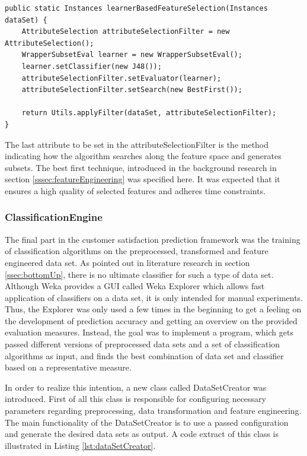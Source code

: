 \begin{lstlisting}[caption={Learner-based feature selection}, label={lst:wrapperBasedFs}]
public static Instances learnerBasedFeatureSelection(Instances dataSet) {
	AttributeSelection attributeSelectionFilter = new AttributeSelection();
	WrapperSubsetEval learner = new WrapperSubsetEval();
	learner.setClassifier(new J48());
	attributeSelectionFilter.setEvaluator(learner);
	attributeSelectionFilter.setSearch(new BestFirst());
	
	return Utils.applyFilter(dataSet, attributeSelectionFilter);
}
\end{lstlisting}

The last attribute to be set in the attributeSelectionFilter is the method indicating how the algorithm searches along the feature space and generates subsets. The best first technique, introduced in the background research in section \ref{sssec:featureEngineering} was specified here. It was expected that it ensures a high quality of selected features and adheres time constraints. 

\subsubsection{ClassificationEngine}
The final part in the customer satisfaction prediction framework was the training of classification algorithms on the preprocessed, transformed and feature engineered data set. As pointed out in literature research in section \ref{ssec:bottomUp}, there is no ultimate classifier for such a type of data set. Although Weka provides a GUI called Weka Explorer which allows fast application of classifiers on a data set, it is only intended for manual experiments. Thus, the Explorer was only used a few times in the beginning to get a feeling on the development of prediction accuracy and getting an overview on the provided evaluation measures. Instead, the goal was to implement a program, which gets passed different versions of preprocessed data sets and a set of classification algorithms as input, and finds the best combination of data set and classifier based on a representative measure. 

In order to realize this intention, a new class called DataSetCreator was introduced. First of all this class is responsible for configuring necessary parameters regarding preprocessing, data transformation and feature engineering. The main functionality of the DataSetCreator is to use a passed configuration and generate the desired data sets as output. A code extract of this class is illustrated in Listing \ref{lst:dataSetCreator}. 

